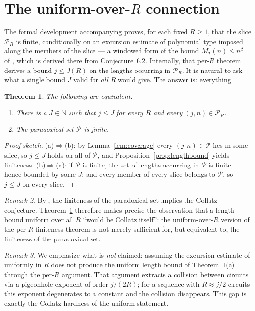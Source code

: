 \documentclass[11pt]{amsart}
\theoremstyle{plain}
\newtheorem{theorem}{Theorem}[section]
\theoremstyle{definition}
\theoremstyle{remark}
\newtheorem{remark}[theorem]{Remark}
\newcommand{\N}{\mathbb{N}}
\newcommand{\Par}{\mathcal{P}}        %
\newcommand{\ParR}[1]{\Par_{#1}}      %
\begin{document}
\section{The uniform-over-\texorpdfstring{$R$}{R} connection}\label{sec:uniform}

The formal development accompanying \cite{Roz25} proves, for each fixed
$R\ge 1$, that the slice $\ParR{R}$ is finite, conditionally on an excursion
estimate of polynomial type imposed along the members of the slice --- a
windowed form of the bound $M_T(n)\le n^{\beta}$ of \cite[eq.~(16)]{Roz25},
which is derived there from Conjecture~6.2.  Internally, that
per-$R$ theorem derives a bound $j\le J(R)$ on the lengths occurring in
$\ParR{R}$.  It is natural to ask what a single bound $J$ valid for
\emph{all} $R$ would give.  The answer is: everything.

\begin{theorem}\label{thm:uniform}
The following are equivalent.
\begin{enumerate}
\item[(a)] There is a $J\in\N$ such that $j\le J$ for every $R$ and every
$(j,n)\in\ParR{R}$.
\item[(b)] The paradoxical set $\Par$ is finite.
\end{enumerate}
\end{theorem}

\begin{proof}[Proof sketch]
(a)$\Rightarrow$(b): by Lemma~\ref{lem:coverage} every $(j,n)\in\Par$ lies in
some slice, so $j\le J$ holds on all of $\Par$, and
Proposition~\ref{prop:lengthbound} yields finiteness.
(b)$\Rightarrow$(a): if $\Par$ is finite, the set of lengths occurring in
$\Par$ is finite, hence bounded by some $J$; and every member of every slice
belongs to $\Par$, so $j\le J$ on every slice.
\end{proof}

\begin{remark}\label{rem:collatz}
By \cite[Cor.~3.3]{Roz25}, the finiteness of the paradoxical set implies the
Collatz conjecture.  Theorem~\ref{thm:uniform} therefore makes precise the
observation that a length bound uniform over all $R$ ``would be Collatz
itself'': the uniform-over-$R$ version of the per-$R$ finiteness theorem is
not merely sufficient for, but equivalent to, the finiteness of the
paradoxical set.
\end{remark}

\begin{remark}\label{rem:notclaimed}
We emphasize what is \emph{not} claimed: assuming the excursion estimate of
\cite[Conj.~6.2]{Roz25} uniformly in $R$ does not produce the uniform length
bound of Theorem~\ref{thm:uniform}(a) through the per-$R$ argument.  That
argument extracts a collision between circuits via a pigeonhole exponent of
order $j/(2R)$; for a sequence with $R\approx j/2$ circuits this exponent
degenerates to a constant and the collision disappears.  This gap is exactly
the Collatz-hardness of the uniform statement.
\end{remark}
\end{document}
